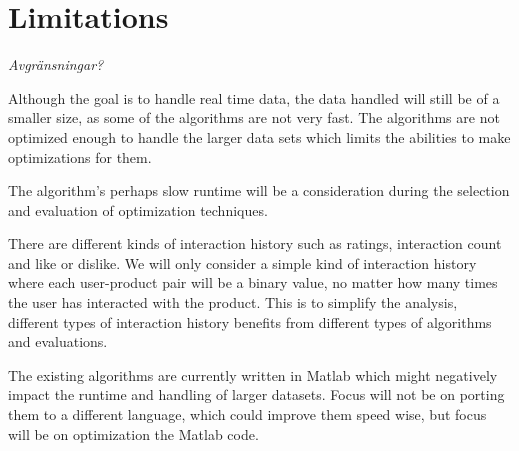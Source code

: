 
\section{Limitations}\label{sec:intro:limitations}

\textit{Avgränsningar?}

Although the goal is to handle real time data, the data handled will still be of a smaller size, as some of the algorithms are not very fast. The algorithms are not optimized enough to handle the larger data sets which limits the abilities to make optimizations for them.

The algorithm's perhaps slow runtime will be a consideration during the selection and evaluation of optimization techniques.

There are different kinds of interaction history such as ratings, interaction count and like or dislike. We will only consider a simple kind of interaction history where each user-product pair will be a binary value, no matter how many times the user has interacted with the product. This is to simplify the analysis, different types of interaction history benefits from different types of algorithms and evaluations.

The existing algorithms are currently written in Matlab which might negatively impact the runtime and handling of larger datasets. Focus will not be on porting them to a different language, which could improve them speed wise, but focus will be on optimization the Matlab code.

